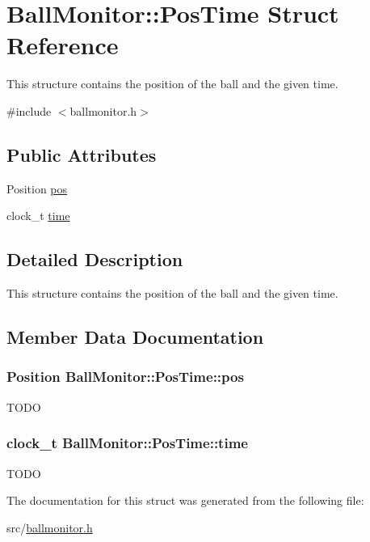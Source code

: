 \hypertarget{structBallMonitor_1_1PosTime}{
\section{BallMonitor::PosTime Struct Reference}
\label{structBallMonitor_1_1PosTime}
}


This structure contains the position of the ball and the given time.  




{\ttfamily \#include $<$ballmonitor.h$>$}

\subsection*{Public Attributes}
\begin{DoxyCompactItemize}
\item 
Position \hyperlink{structBallMonitor_1_1PosTime_ae049de4ada401c92ec560198e5947e59}{pos}
\item 
clock\_\-t \hyperlink{structBallMonitor_1_1PosTime_ae56e28b26f0d91d164d5bfe0b0644cb2}{time}
\end{DoxyCompactItemize}


\subsection{Detailed Description}
This structure contains the position of the ball and the given time. 

\subsection{Member Data Documentation}
\hypertarget{structBallMonitor_1_1PosTime_ae049de4ada401c92ec560198e5947e59}{
\subsubsection[{pos}]{\setlength{\rightskip}{0pt plus 5cm}Position {\bf BallMonitor::PosTime::pos}}}
\label{structBallMonitor_1_1PosTime_ae049de4ada401c92ec560198e5947e59}
TODO \hypertarget{structBallMonitor_1_1PosTime_ae56e28b26f0d91d164d5bfe0b0644cb2}{
\subsubsection[{time}]{\setlength{\rightskip}{0pt plus 5cm}clock\_\-t {\bf BallMonitor::PosTime::time}}}
\label{structBallMonitor_1_1PosTime_ae56e28b26f0d91d164d5bfe0b0644cb2}
TODO 

The documentation for this struct was generated from the following file:\begin{DoxyCompactItemize}
\item 
src/\hyperlink{ballmonitor_8h}{ballmonitor.h}\end{DoxyCompactItemize}
